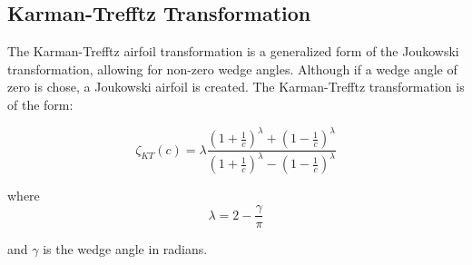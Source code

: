 \subsection{Karman-Trefftz Transformation}
The Karman-Trefftz airfoil transformation is a generalized form of the Joukowski transformation, allowing for non-zero wedge angles.  Although if a wedge angle of zero is chose, a Joukowski airfoil is created.  The Karman-Trefftz transformation is of the form:

\begin{equation}
\zeta_{KT}(c) = \lambda \frac{\left(1+\frac{1}{c}\right)^\lambda + \left(1-\frac{1}{c}\right)^\lambda}{\left(1+\frac{1}{c}\right)^\lambda - \left(1-\frac{1}{c}\right)^\lambda}
\end{equation}

where \[\lambda = 2 - \frac{\gamma}{\pi}\]

and $\gamma$ is the wedge angle in radians.\cite{Blom1983}


\bigskip

 
{}


